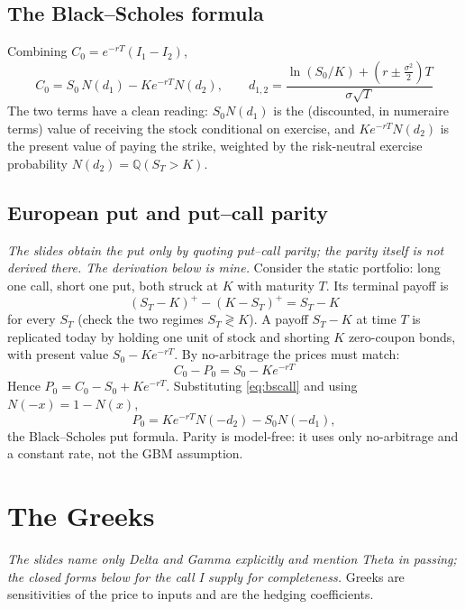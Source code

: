 \documentclass[11pt]{article}
\begin{document}
\subsection{The Black--Scholes formula}
Combining $C_0 = e^{-rT}(I_1 - I_2)$,
\begin{equation}\label{eq:bscall}
\boxed{\;C_0 = S_0\,N(d_1) - K e^{-rT} N(d_2),
\qquad
d_{1,2} = \frac{\ln(S_0/K) + (r\pm\tfrac{\sigma^2}{2})T}{\sigma\sqrt T}\;}
\end{equation}
The two terms have a clean reading: $S_0 N(d_1)$ is the (discounted, in numeraire terms) value of
receiving the stock conditional on exercise, and $Ke^{-rT}N(d_2)$ is the present value of paying the
strike, weighted by the risk-neutral exercise probability $N(d_2) = \mathbb Q(S_T>K)$.

\subsection{European put and put--call parity}
\emph{The slides obtain the put only by quoting put--call parity; the parity itself is not derived
there. The derivation below is mine.} Consider the static portfolio: long one call, short one put,
both struck at $K$ with maturity $T$. Its terminal payoff is
\begin{equation}
(S_T-K)^+ - (K-S_T)^+ = S_T - K
\end{equation}
for every $S_T$ (check the two regimes $S_T\gtrless K$). A payoff $S_T - K$ at time $T$ is replicated
today by holding one unit of stock and shorting $K$ zero-coupon bonds, with present value
$S_0 - Ke^{-rT}$. By no-arbitrage the prices must match:
\begin{equation}\label{eq:parity}
\boxed{\;C_0 - P_0 = S_0 - K e^{-rT}\;}
\end{equation}
Hence $P_0 = C_0 - S_0 + Ke^{-rT}$. Substituting \eqref{eq:bscall} and using $N(-x) = 1-N(x)$,
\begin{equation}
P_0 = K e^{-rT} N(-d_2) - S_0 N(-d_1),
\end{equation}
the Black--Scholes put formula. Parity is model-free: it uses only no-arbitrage and a constant rate,
not the GBM assumption.

\section{The Greeks}
\emph{The slides name only Delta and Gamma explicitly and mention Theta in passing; the closed forms
below for the call I supply for completeness.} Greeks are sensitivities of the price to inputs and are
the hedging coefficients.
\end{document}
